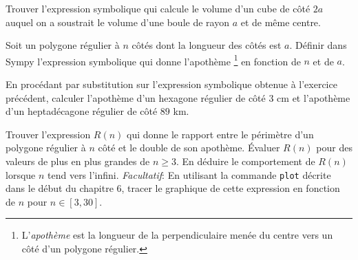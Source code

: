 \begin{exercice}
    Trouver l'expression symbolique qui calcule le volume d'un cube de côté
    $2a$ auquel on a soustrait le volume d'une boule de rayon $a$ et de même
    centre.
\end{exercice}

\begin{exercice}\label{exo:apotheme}
Soit un polygone régulier à $n$ côtés dont la longueur des côtés est $a$.
Définir dans Sympy l'expression symbolique qui donne l'apothème
\footnote{L'\emph{apothème} est la longueur de la perpendiculaire menée du
centre vers un côté d'un polygone régulier.} en fonction de $n$ et de $a$. 
\end{exercice}


\begin{exercice}
En procédant par substitution sur l'expression symbolique obtenue à
l'exercice précédent, calculer l'apothème d'un hexagone régulier de
côté $3$ cm et l'apothème d'un heptadécagone régulier de côté $89$ km.
\end{exercice}

\begin{exercice}
    Trouver l'expression $R(n)$ qui donne le rapport entre le périmètre d'un
    polygone régulier à $n$ côté et le double de son apothème. 
    Évaluer $R(n)$ pour des valeurs de plus en plus grandes de $n\geq3$.
    En déduire le comportement de $R(n)$ lorsque $n$ tend vers l'infini.
    \textit{Facultatif}: En utilisant la commande \texttt{plot} décrite dans le
    début du chapitre 6, tracer le graphique de cette expression en fonction de $n$
    pour $n\in[3,30]$. 
\end{exercice}

